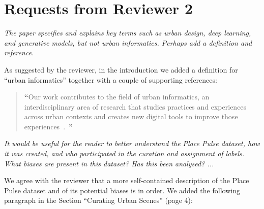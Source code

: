\documentclass{paper}
\newenvironment{myquote}
{\definecolor{shadecolor}{rgb}{0.9,0.95,1} \begin{shaded*} \sf \em}
{\em\end{shaded*}}
\begin{document}
\section*{Requests from Reviewer 2}

\begin{myquote}
    The paper specifies and explains key terms such as urban design, deep learning, and generative models, but not urban informatics. Perhaps add a definition and reference. 
\end{myquote}

\noindent As suggested by the reviewer, in the introduction we added a definition for ``urban informatics'' together with a couple of supporting references:

\begin{quote}
{\bf \Large ``}Our work contributes to the field of urban informatics, an interdisciplinary area of research that studies practices and experiences across urban contexts and creates new digital tools to improve those experiences~\cite{foth2009handbook,foth2011urban}.~{\bf \Large ''}
\end{quote}


\begin{myquote}
    It would be useful for the reader to better understand the Place Pulse dataset, how it was created, and who participated in the curation and assignment of labels. What biases are present in this dataset? Has this been analysed? ...
\end{myquote}
%
%
\noindent We agree with the reviewer that a more self-contained description of the Place Pulse dataset and of its potential biases is in order. We added the following paragraph in the Section ``Curating Urban Scenes'' (page 4):
\end{document}
